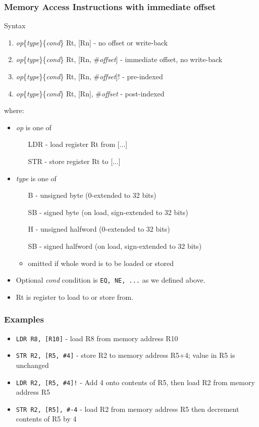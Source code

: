 \documentclass[10pt]{beamer}
\begin{document}
\begin{frame}
\frametitle{Memory Access Instructions with immediate offset}
Syntax
\begin{enumerate}
\item {\color{brown}\textit{op}\{\textit{type}\}\{\textit{cond}\} Rt, [Rn]} - no offset or write-back
\item {\color{brown}\textit{op}\{\textit{type}\}\{\textit{cond}\} Rt, [Rn, \#\textit{offset}]} - immediate offset, no write-back
\item {\color{brown}\textit{op}\{\textit{type}\}\{\textit{cond}\} Rt, [Rn, \#\textit{offset}]!} - pre-indexed
\item {\color{brown}\textit{op}\{\textit{type}\}\{\textit{cond}\} Rt, [Rn], \#\textit{offset}} - post-indexed
\end{enumerate}

where:
\begin{itemize}
\item \textit{op} is one of
  \begin{itemize}
  \item[LDR] - load register Rt from [...]
  \item[STR] - store register Rt to [...]
  \end{itemize}
\item \textit{type} is one of
  \begin{itemize}
  \item[B] - unsigned byte (0-extended to 32 bits)
  \item[SB] - signed byte (on load, sign-extended to 32 bits)
  \item[H] - unsigned halfword (0-extended to 32 bits)
  \item[SB] - signed halfword (on load, sign-extended to 32 bits)
  \item omitted if whole word is to be loaded or stored
  \end{itemize}
\item Optional \textit{cond} condition is \texttt{EQ, NE, ...} as we defined above.
\item Rt is register to load to or store from.
\end{itemize}
\end{frame}

\begin{frame}
\frametitle{Examples}
\begin{itemize}
\item \texttt{\color{brown}LDR R8, [R10]} - load R8 from memory address R10
\item \texttt{\color{brown}STR R2, [R5, \#4]} - store R2 to memory address R5+4; value in R5 is unchanged
\item \texttt{\color{brown}LDR R2, [R5, \#4]!} - Add 4 onto contents of R5, then  load R2 from memory address R5
\item \texttt{\color{brown}STR R2, [R5], \#-4} - load R2 from memory address R5 then decrement contents of R5 by 4
\end{itemize}
\end{frame}
\end{document}
